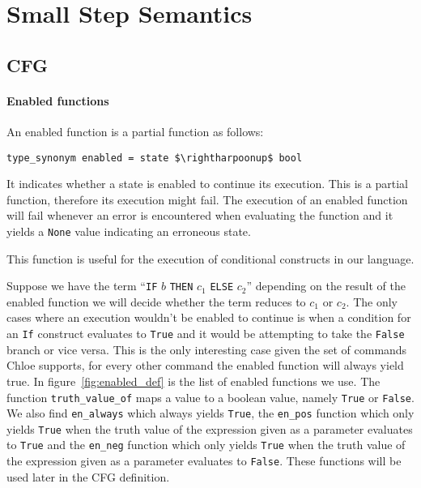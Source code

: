 \section{Small Step Semantics}\label{section:small_step}

\begin{comment}
add a little summary here.
\end{comment}

\subsection{CFG}\label{subsection:cfg}

\paragraph{Enabled functions}\label{paragraph:enabled}

An enabled function is a partial function as follows:

\begin{lstlisting}[mathescape=true, frame=single]
type_synonym enabled = state $\rightharpoonup$ bool
\end{lstlisting}

It indicates whether a state is enabled to continue its execution.
This is a partial function, therefore its execution might fail.
The execution of an enabled function will fail whenever an error is encountered when evaluating the function and it yields a \verb|None| value indicating an erroneous state.

This function is useful for the execution of conditional constructs in our language.

Suppose we have the term ``\verb|IF| $b$ \verb|THEN| $c_{1}$ \verb|ELSE| $c_{2}$'' depending on the result of the enabled function we will decide whether the term reduces to $c_{1}$ or $c_{2}$.
The only cases where an execution wouldn't be enabled to continue is when a condition for an \verb|If| construct evaluates to \verb|True| and it would be attempting to take the \verb|False| branch or vice versa.
This is the only interesting case given the set of commands Chloe supports, for every other command the enabled function will always yield true.
In figure~\ref{fig:enabled_def} is the list of enabled functions we use.
The function \verb|truth_value_of| maps a value to a boolean value, namely \verb|True| or \verb|False|.
We also find \verb|en_always| which always yields \verb|True|, the \verb|en_pos| function which only yields \verb|True| when the truth value of the expression given as a parameter evaluates to \verb|True| and the \verb|en_neg| function which only yields \verb|True| when the truth value of the expression given as a parameter evaluates to \verb|False|.
These functions will be used later in the CFG definition.

